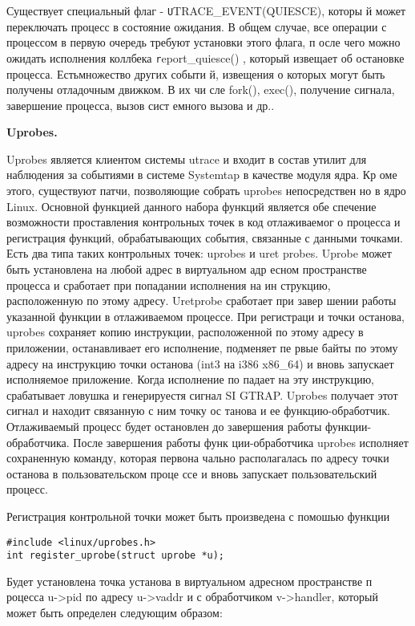 \bigskip 
Существует специальный флаг - {\texttt UTRACE\_EVENT(QUIESCE)}, которы
й может переключать процесс в состояние ожидания. В общем случае, все 
операции с процессом в первую очередь требуют установки этого флага, п
осле чего можно ожидать исполнения коллбека {\texttt report\_quiesce()
}, который извещает об остановке процесса. Естьмножество других событи
й, извещения о которых могут быть получены отладочным движком. В их чи
сле fork(), exec(), получение сигнала, завершение процесса, вызов сист
емного вызова и др..

\bigskip
{\bfseries Uprobes.}

\bigskip
Uprobes является клиентом системы utrace и входит в состав утилит для 
наблюдения за событиями в системе Systemtap в качестве модуля ядра. Кр
оме этого, существуют патчи, позволяющие собрать uprobes непосредствен
но в ядро Linux. Основной функцией данного набора функций является обе
спечение возможности проставления контрольных точек в код отлаживаемог
о процесса и регистрация функций, обрабатывающих события, связанные с 
данными точками. Есть два типа таких контрольных точек: uprobes и uret
probes. Uprobe может быть установлена на любой адрес в виртуальном адр
есном пространстве процесса и сработает при попадании исполнения на ин
струкцию, расположенную по этому адресу. Uretprobe сработает при завер
шении работы указанной функции в отлаживаемом процессе. При регистраци
и точки останова, uprobes сохраняет копию инструкции, расположенной по
 этому адресу в приложении, останавливает его исполнение, подменяет пе
рвые байты по этому адресу на инструкцию точки останова (int3 на i386 
x86\_64) и вновь запускает исполняемое приложение. Когда исполнение по
падает на эту инструкцию, срабатывает ловушка и генерируестя сигнал SI
GTRAP. Uprobes получает этот сигнал и находит связанную с ним точку ос
танова и ее функцию-обработчик. Отлаживаемый процесс будет остановлен 
до завершения работы функции-обработчика. После завершения работы функ
ции-обработчика uprobes исполняет сохраненную команду, которая первона
чально располагалась по адресу точки останова в пользовательском проце
ссе и вновь запускает пользовательский процесс.   

Регистрация контрольной точки может быть произведена с помошью функции
 

\bigskip 
\begin{lstlisting}
#include <linux/uprobes.h>
int register_uprobe(struct uprobe *u); 
\end{lstlisting}

Будет установлена точка установа в виртуальном адресном пространстве п
роцесса u->pid по адресу u->vaddr и с обработчиком v->handler, который
 может быть определен следующим образом: 

